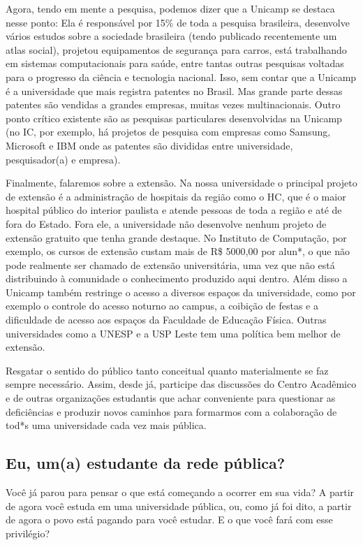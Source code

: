 Agora, tendo em mente a pesquisa, podemos dizer que a Unicamp se destaca nesse
ponto: Ela é responsável por 15\% de toda a pesquisa brasileira, desenvolve
vários estudos sobre a sociedade brasileira (tendo publicado recentemente um
atlas social), projetou equipamentos de segurança para carros, está trabalhando
em sistemas computacionais para saúde, entre tantas outras pesquisas voltadas
para o progresso da ciência e tecnologia nacional. Isso, sem contar que a
Unicamp é a universidade que mais registra patentes no Brasil. Mas grande parte
dessas patentes são vendidas a grandes empresas, muitas vezes multinacionais.
Outro ponto crítico existente são as pesquisas particulares desenvolvidas na
Unicamp (no IC, por exemplo, há projetos de pesquisa com empresas como Samsung,
Microsoft e IBM onde as patentes são divididas entre universidade,
pesquisador(a) e empresa).

Finalmente, falaremos sobre a extensão. Na nossa universidade o principal
projeto de extensão é a administração de hospitais da região como o HC, que é o
maior hospital público do interior paulista e atende pessoas de toda a região e
até de fora do Estado. Fora ele, a universidade não desenvolve nenhum projeto
de extensão gratuito que tenha grande destaque. No Instituto de Computação, por
exemplo, os cursos de extensão custam mais de R\$ 5000,00 por alun*, o que não
pode realmente ser chamado de extensão universitária, uma vez que não está
distribuindo à comunidade o conhecimento produzido aqui dentro.  Além disso a
Unicamp também restringe o acesso a diversos espaços da universidade, como por
exemplo o controle do acesso noturno ao campus, a coibição de festas e a
dificuldade de acesso aos espaços da Faculdade de Educação Física. Outras
universidades como a UNESP e a USP Leste tem uma política bem melhor de
extensão.

Resgatar o sentido do público tanto conceitual quanto materialmente se faz
sempre necessário. Assim, desde já, participe das discussões do Centro
Acadêmico e de outras organizações estudantis que achar conveniente para
questionar as deficiências e produzir novos caminhos para formarmos com a
colaboração de tod*s uma universidade cada vez mais pública.

\subsection*{Eu, um(a) estudante da rede pública?}

Você já parou para pensar o que está começando a ocorrer em sua vida? A partir
de agora você estuda em uma universidade pública, ou, como já foi dito, a
partir de agora o povo está pagando para você estudar. E o que você fará com
esse privilégio?

